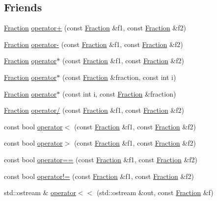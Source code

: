 \subsection*{Friends}
\begin{DoxyCompactItemize}
\item 
\hyperlink{classprism_1_1_fraction}{Fraction} \hyperlink{classprism_1_1_fraction_a225c4aec1a9cdd366b04be2642ecf3bc}{operator+} (const \hyperlink{classprism_1_1_fraction}{Fraction} \&f1, const \hyperlink{classprism_1_1_fraction}{Fraction} \&f2)
\item 
\hyperlink{classprism_1_1_fraction}{Fraction} \hyperlink{classprism_1_1_fraction_aa93e0ab89fa477f3b044cf5826df7c14}{operator-\/} (const \hyperlink{classprism_1_1_fraction}{Fraction} \&f1, const \hyperlink{classprism_1_1_fraction}{Fraction} \&f2)
\item 
\hyperlink{classprism_1_1_fraction}{Fraction} \hyperlink{classprism_1_1_fraction_ad106ee756801021779f14e992439db4a}{operator$\ast$} (const \hyperlink{classprism_1_1_fraction}{Fraction} \&f1, const \hyperlink{classprism_1_1_fraction}{Fraction} \&f2)
\item 
\hyperlink{classprism_1_1_fraction}{Fraction} \hyperlink{classprism_1_1_fraction_a00eb461e6959195ce533d9d8f9b0855d}{operator$\ast$} (const \hyperlink{classprism_1_1_fraction}{Fraction} \&fraction, const int i)
\item 
\hyperlink{classprism_1_1_fraction}{Fraction} \hyperlink{classprism_1_1_fraction_a2f76d38f8274375542a97c3154af16eb}{operator$\ast$} (const int i, const \hyperlink{classprism_1_1_fraction}{Fraction} \&fraction)
\item 
\hyperlink{classprism_1_1_fraction}{Fraction} \hyperlink{classprism_1_1_fraction_a2a185031bd64d6b227509aeacf3b5c69}{operator/} (const \hyperlink{classprism_1_1_fraction}{Fraction} \&f1, const \hyperlink{classprism_1_1_fraction}{Fraction} \&f2)
\item 
const bool \hyperlink{classprism_1_1_fraction_a557b4641e321113411fe440a2bc4e9cb}{operator$<$} (const \hyperlink{classprism_1_1_fraction}{Fraction} \&f1, const \hyperlink{classprism_1_1_fraction}{Fraction} \&f2)
\item 
const bool \hyperlink{classprism_1_1_fraction_a4307a97fd1a744418e8e2d64fb05ffd5}{operator$>$} (const \hyperlink{classprism_1_1_fraction}{Fraction} \&f1, const \hyperlink{classprism_1_1_fraction}{Fraction} \&f2)
\item 
const bool \hyperlink{classprism_1_1_fraction_a061d9325f891c3601d892edce079652b}{operator==} (const \hyperlink{classprism_1_1_fraction}{Fraction} \&f1, const \hyperlink{classprism_1_1_fraction}{Fraction} \&f2)
\item 
const bool \hyperlink{classprism_1_1_fraction_a2469410854b8425a70b1489afa5651d5}{operator!=} (const \hyperlink{classprism_1_1_fraction}{Fraction} \&f1, const \hyperlink{classprism_1_1_fraction}{Fraction} \&f2)
\item 
std\+::ostream \& \hyperlink{classprism_1_1_fraction_aae68a18403f22736f297b8671746f144}{operator$<$$<$} (std\+::ostream \&out, const \hyperlink{classprism_1_1_fraction}{Fraction} \&f)
\end{DoxyCompactItemize}


